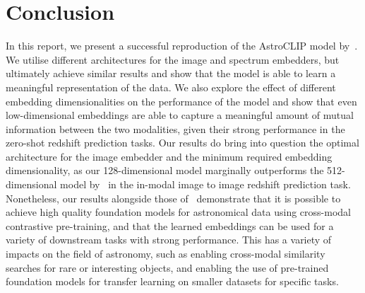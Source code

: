 
\section{Conclusion}\label{sec:conclusion}
In this report, we present a successful reproduction of the AstroCLIP model by~\cite{astroclip}.
We utilise different architectures for the image and spectrum embedders, but ultimately achieve similar results
and show that the model is able to learn a meaningful representation of the data.
We also explore the effect of different embedding dimensionalities on the performance of the model and show that
even low-dimensional embeddings are able to capture a meaningful amount of mutual information between the two modalities,
given their strong performance in the zero-shot redshift prediction tasks.
Our results do bring into question the optimal architecture for the image embedder and the minimum required
embedding dimensionality, as our 128-dimensional model marginally outperforms the 512-dimensional model by~\cite{astroclip}
in the in-modal image to image redshift prediction task.
Nonetheless, our results alongside those of~\cite{astroclip} demonstrate that it is possible to achieve high quality foundation
models for astronomical data using cross-modal contrastive pre-training, and that the learned embeddings can be used for a variety
of downstream tasks with strong performance.
This has a variety of impacts on the field of astronomy, such as enabling cross-modal similarity searches for rare or interesting
objects, and enabling the use of pre-trained foundation models for transfer learning on smaller datasets for specific tasks.
